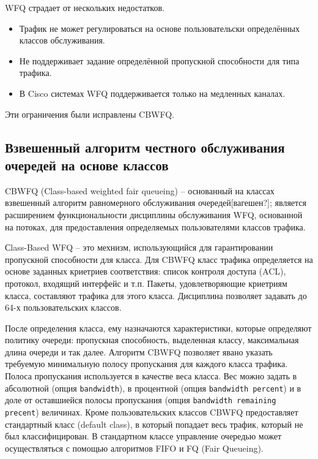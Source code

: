     WFQ страдает от нескольких недостатков.
    \begin{itemize}
        \item Трафик не может регулироваться на основе пользовательски определённых классов обслуживания.
        \item Не поддерживает задание определённой пропускной способности для типа трафика.
		\item В Cisco системах WFQ поддерживается только на медленных каналах.\cite{wfqdis}
    \end{itemize}

    Эти ограничения были исправлены CBWFQ.

    \subsection{Взвешенный алгоритм честного обслуживания очередей на основе классов}


    CBWFQ (Class-based weighted fair queueing) -- основанный на классах взвешенный алгоритм равномерного обслуживания 
    очередей[вагешен?]; является расширением функциональности дисциплины обслуживания WFQ,
    основанной на потоках, для предоставления определяемых пользователями классов трафика. 

    Сlass-Based WFQ -- это мехнизм, использующийся для гарантировании пропускной способности
    для класса. Для CBWFQ класс трафика определяется на основе заданных криетриев
    соответствия: список контроля доступа (ACL), протокол, входящий интерфейс и т.п. Пакеты,
    удовлетворяющие криетриям класса, составляют трафика для этого класса. Дисциплина
    позволяет задавать до 64-х пользовательских классов.

    После определения класса, ему назначаются характеристики, которые определяют
    политику очереди: пропускная способность, выделенная классу, максимальная
    длина очереди и так далее. Алгоритм CBWFQ позволяет явано указать требуемую минимальную
    полосу пропускания для каждого класса трафика. Полоса пропускания используется
    в качестве веса класса. Вес можно задать в абсолютной (опция \texttt{bandwidth}),
    в процентной (опция \texttt{bandwidth percent}) и в доле от оставшиейся
    полосы пропускания (опция \texttt{bandwidth remaining precent}) величинах.
    Кроме пользовательских классов CBWFQ предоставляет стандартный класс (default class),
    в который попадает весь трафик, который не был классифицирован. В стандартном классе
    управление очередью может осуществляться с помощью алгоритмов FIFO и FQ (Fair Queueing). \cite{ciscoguide} 

